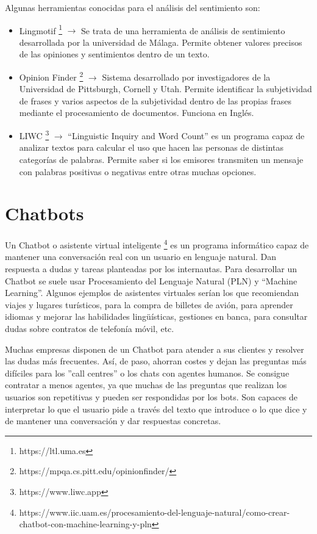 Algunas herramientas conocidas para el análisis del sentimiento son:
\begin{itemize}
	\item Lingmotif \footnote{https://ltl.uma.es} $\rightarrow$ Se trata de una herramienta de análisis de sentimiento desarrollada por la universidad de Málaga. Permite obtener valores precisos de las opiniones y sentimientos dentro de un texto.
	\item Opinion Finder \footnote{https://mpqa.cs.pitt.edu/opinionfinder/} $\rightarrow$ Sistema desarrollado por investigadores de la Universidad de Pittsburgh, Cornell y Utah. Permite identificar la subjetividad de frases y varios aspectos de la subjetividad dentro de las propias frases mediante el procesamiento de documentos. Funciona en Inglés.
	\item LIWC \footnote{https://www.liwc.app} $\rightarrow$ ``Linguistic Inquiry and Word Count'' es un programa capaz de analizar textos para calcular el uso que hacen las personas de distintas categorías de palabras. Permite saber si los emisores transmiten un mensaje con palabras positivas o negativas entre otras muchas opciones.
\end{itemize}


\section{Chatbots} \label{chatbot}

Un Chatbot o asistente virtual inteligente \footnote{https://www.iic.uam.es/procesamiento-del-lenguaje-natural/como-crear-chatbot-con-machine-learning-y-pln} es un programa informático capaz de mantener una conversación real con un usuario en lenguaje natural. Dan respuesta a dudas y tareas planteadas por los internautas. Para desarrollar un Chatbot se suele usar Procesamiento del Lenguaje Natural (PLN) y ``Machine Learning''.  Algunos ejemplos de asistentes virtuales serían los que recomiendan viajes y lugares turísticos, para la compra de billetes de avión, para aprender idiomas y mejorar las habilidades lingüísticas, gestiones en banca, para consultar dudas sobre contratos de telefonía móvil, etc.

Muchas empresas disponen de un Chatbot para atender a sus clientes y resolver las dudas más frecuentes. Así, de paso, ahorran costes y dejan las preguntas más difíciles para los ''call centres'' o los chats con agentes humanos. Se consigue  contratar a menos agentes, ya que muchas de las preguntas que realizan los usuarios son repetitivas y pueden ser respondidas por los bots. Son capaces de interpretar lo que el usuario pide a través del texto que introduce o lo que dice y de mantener una conversación y dar respuestas concretas. 

